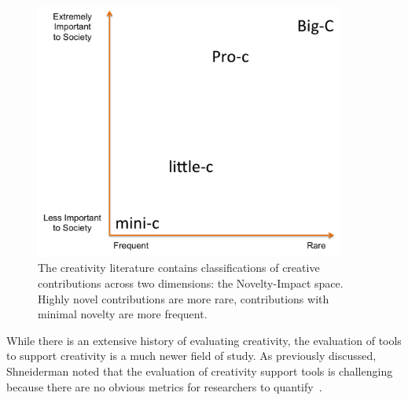 \begin{figure}[t]
\centering
\includegraphics[width=4in]{images/spectrum.png}
\caption[Novelty-Impact Space of Creativity]{The creativity literature contains classifications of creative contributions across two dimensions: the Novelty-Impact space. Highly novel contributions are more rare, contributions with minimal novelty are more frequent.}
\label{NIspace}
\end{figure}

\label{CSTEvaluation}
While there is an extensive history of evaluating creativity, the evaluation of tools to support creativity is a much newer field of study. As previously discussed, Shneiderman noted that the evaluation of creativity support tools is challenging because there are no obvious metrics for researchers to quantify~\cite{Shneiderman:2007wp}. 
